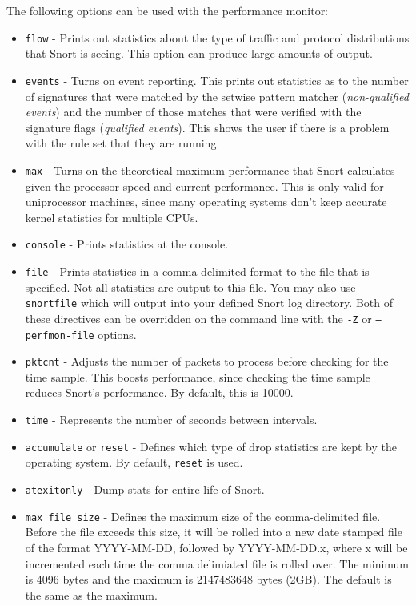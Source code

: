 \documentclass[english]{report}
\begin{document}
The following options can be used with the performance monitor:

\begin{itemize}

\item \texttt{flow} - Prints out statistics about the type of traffic and
protocol distributions that Snort is seeing. This option can produce large
amounts of output.

\item \texttt{events} - Turns on event reporting.  This prints out statistics
as to the number of signatures that were matched by the setwise pattern matcher
(\textit{non-qualified events}) and the number of those matches that were
verified with the signature flags (\textit{qualified events}).  This shows the
user if there is a problem with the rule set that they are running.

\item \texttt{max} - Turns on the theoretical maximum performance that Snort
calculates given the processor speed and current performance.  This is only
valid for uniprocessor machines, since many operating systems don't keep
accurate kernel statistics for multiple CPUs.  

\item \texttt{console} - Prints statistics at the console.

\item \texttt{file} - Prints statistics in a comma-delimited format to the file
that is specified.  Not all statistics are output to this file.  You may also
use \texttt{snortfile} which will output into your defined Snort log directory.
Both of these directives can be overridden on the command line with the
\texttt{-Z} or \texttt{--perfmon-file} options.

\item \texttt{pktcnt} - Adjusts the number of packets to process before
checking for the time sample.  This boosts performance, since checking the time
sample reduces Snort's performance.  By default, this is 10000.  

\item \texttt{time} - Represents the number of seconds between intervals.

\item \texttt{accumulate} or \texttt{reset} - Defines which type of drop
statistics are kept by the operating system. By default, \texttt{reset} is
used.

\item \texttt{atexitonly} - Dump stats for entire life of Snort.

\item \texttt{max\_file\_size} - Defines the maximum size of the
comma-delimited file.  Before the file exceeds this size, it will be rolled
into a new date stamped file of the format YYYY-MM-DD, followed by
YYYY-MM-DD.x, where x will be incremented each time the comma delimiated file
is rolled over.  The minimum is 4096 bytes and the maximum is 2147483648 bytes
(2GB).  The default is the same as the maximum.

\end{itemize}
\end{document}
